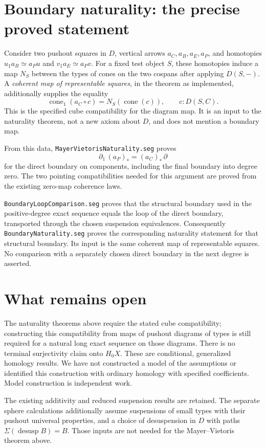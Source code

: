 \documentclass[11pt]{amsart}
\newcommand{\code}[1]{\nolinkurl{#1}}
\begin{document}
\section{Boundary naturality: the precise proved statement}
Consider two pushout squares in $D$, vertical arrows
$a_C,a_B,a_E,a_P$, and homotopies
$u_1a_B\simeq a_Pu$ and $v_1a_E\simeq a_Pv$.
For a fixed test object $S$, these homotopies induce a map $N_S$ between
the types of cones on the two cospans after applying $D(S,-)$.
A \emph{coherent map of representable squares}, in the theorem as
implemented, additionally supplies the equality
\[
 \operatorname{cone}_1(a_C\circ c)
   =N_S(\operatorname{cone}(c)),\qquad c:D(S,C).
\]
This is the specified cube compatibility for the diagram map. It is
an input to the naturality theorem, not a new axiom about $D$, and does
not mention a boundary map.

From this data, \code{MayerVietorisNaturality.seg} proves
\[
 \partial_1\,(a_P)_*=(a_C)_*\,\partial
\]
for the direct boundary on components, including the final boundary
into degree zero. The two pointing compatibilities needed for this
argument are proved from the existing zero-map coherence laws.

\code{BoundaryLoopComparison.seg} proves that the structural boundary
used in the positive-degree exact sequence equals the loop of the
direct boundary, transported through the chosen suspension equivalences.
Consequently \code{BoundaryNaturality.seg} proves the corresponding
naturality statement for that structural boundary. Its input is the
same coherent map of representable squares. No comparison with a
separately chosen direct boundary in the next degree is asserted.

\section{What remains open}
The naturality theorems above require the stated cube compatibility;
constructing this compatibility from maps of pushout diagrams of types
is still required for a natural long exact sequence on those diagrams.
There is no terminal surjectivity claim onto $H_0X$.
These are conditional, generalized homology results. We have not
constructed a model of the assumptions or identified this construction
with ordinary homology with specified coefficients. Model construction
is independent work.

The existing additivity and reduced suspension results are retained.
The separate sphere calculations additionally assume suspensions of
small types with their pushout universal properties, and a choice of
desuspension in $D$ with paths $\Sigma(\operatorname{desusp}B)=B$.
Those inputs are not needed for the Mayer--Vietoris theorem above.
\end{document}
